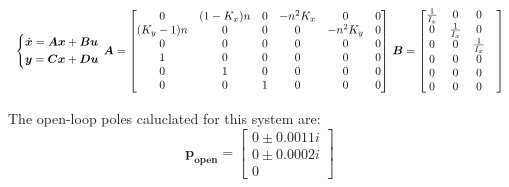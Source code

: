 \begin{equation}
    \begin{tabular}{c c c c}
        $\begin{dcases}
            \dot{\boldsymbol{x}} = \boldsymbol{Ax} + \boldsymbol{Bu} \\
            \boldsymbol{y}       = \boldsymbol{Cx} + \boldsymbol{Du} \\
        \end{dcases}$
        $\boldsymbol{A} =
        \begin{bmatrix}
            0 & (1-K_x)n & 0 & -n^2K_x & 0 & 0 \\   
            (K_y-1)n & 0 & 0 & 0 & -n^2K_y & 0 \\   
            0 & 0 & 0 & 0 & 0 & 0 \\   
            1 & 0 & 0 & 0 & 0 & 0 \\   
            0 & 1 & 0 & 0 & 0 & 0 \\   
            0 & 0 & 1 & 0 & 0 & 0   
        \end{bmatrix}$
        $\boldsymbol{B}=
        \begin{bmatrix}
            \frac{1}{I_x} & 0 & 0 \\   
            0 & \frac{1}{I_x} & 0 \\   
            0 & 0 & \frac{1}{I_x} \\   
            0 & 0 & 0 & \\   
            0 & 0 & 0 & \\
            0 & 0 & 0 &   
        \end{bmatrix}$
    \end{tabular}
\end{equation}

The open-loop poles caluclated for this system are:
\begin{equation}
    \boldsymbol{p_{open}} =
    \begin{bmatrix}
        0 \pm 0.0011i \\   
        0 \pm 0.0002i \\   
        0
    \end{bmatrix}
\end{equation}

